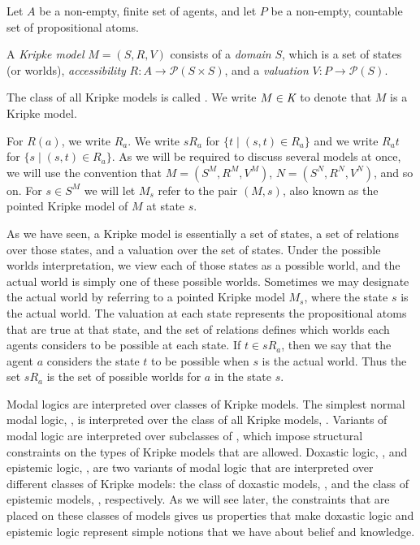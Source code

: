 Let $A$ be a non-empty, finite set of agents, and let $P$ be a non-empty,
countable set of propositional atoms.

\begin{definition}
A \textit{Kripke model} $M = (S, R, V)$ consists of a \textit{domain} $S$, which
is a set of states (or worlds), \textit{accessibility} $R : A \to \mathcal{P}(S
\times S)$, and a \textit{valuation} $V : P \to \mathcal{P}(S)$. 

The class of all Kripke models is called \classK{}. We write $M \in \textit{K}{}$
to denote that $M$ is a Kripke model.
\end{definition}

For $R(a)$, we write $R_a$. We write $sR_a$ for $\{t \mid (s, t) \in R_a\}$ and
we write $R_at$ for $\{s \mid (s, t) \in R_a\}$. As we will be required to
discuss several models at once, we will use the convention that $M = (S^M, R^M,
V^M)$, $N = (S^N, R^N, V^N)$, and so on. For $s \in S^M$ we will let $M_s$ refer
to the pair $(M, s)$, also known as the pointed Kripke model of $M$ at state
$s$.

As we have seen, a Kripke model is essentially a set of states, a set of
relations over those states, and a valuation over the set of states. Under the
possible worlds interpretation, we view each of those states as a possible
world, and the actual world is simply one of these possible worlds. Sometimes
we may designate the actual world by referring to a pointed Kripke model $M_s$,
where the state $s$ is the actual world. The valuation at each state represents
the propositional atoms that are true at that state, and the set of relations
defines which worlds each agents considers to be possible at each state. If $t
\in sR_a$, then we say that the agent $a$ considers the state $t$ to be
possible when $s$ is the actual world. Thus the set $sR_a$ is the set of
possible worlds for $a$ in the state $s$.

Modal logics are interpreted over classes of Kripke models. The simplest normal
modal logic, \logicK{}, is interpreted over the class of all Kripke models,
\classK{}. Variants of modal logic are interpreted over subclasses of \classK{},
which impose structural constraints on the types of Kripke models that are
allowed. Doxastic logic, \logicKD{}, and epistemic logic, \logicS{}, are two
variants of modal logic that are interpreted over different classes of Kripke
models: the class of doxastic models, \classKD{}, and the class of epistemic
models, \classS{}, respectively. As we will see later, the constraints that are
placed on these classes of models gives us properties that make doxastic logic
and epistemic logic represent simple notions that we have about belief and
knowledge.

